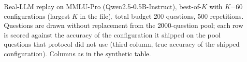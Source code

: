 Real-LLM replay on MMLU-Pro (Qwen2.5-0.5B-Instruct), best-of-$K$ with $K$=60 configurations (largest $K$ in the file), total budget 200 questions, 500 repetitions. Questions are drawn without replacement from the 2000-question pool; each row is scored against the accuracy of the configuration it shipped on the pool questions that protocol did not use (third column, true accuracy of the shipped configuration). Columns as in the synthetic table.
